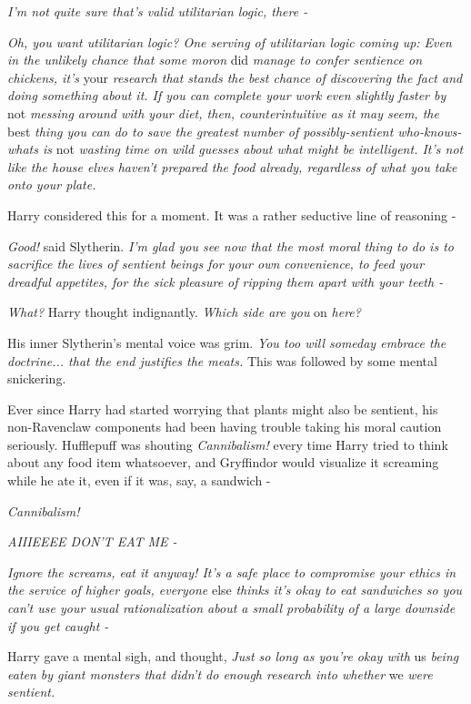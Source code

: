 \emph{I'm not quite sure that's valid utilitarian logic, there -}

\emph{Oh, you want utilitarian logic? One serving of utilitarian logic
coming up: Even in the unlikely chance that some moron} did \emph{manage
to confer sentience on chickens, it's} your \emph{research that stands
the best chance of discovering the fact and doing something about it. If
you can complete your work even slightly faster by} not \emph{messing
around with your diet, then, counterintuitive as it may seem, the} best
\emph{thing you can do to save the greatest number of possibly-sentient
who-knows-whats is} not \emph{wasting time on wild guesses about what
might be intelligent. It's not like the house elves haven't prepared the
food already, regardless of what you take onto your plate.}

Harry considered this for a moment. It was a rather seductive line of
reasoning -

\emph{Good!} said Slytherin. \emph{I'm glad you see now that the most
moral thing to do is to sacrifice the lives of sentient beings for your
own convenience, to feed your dreadful appetites, for the sick pleasure
of ripping them apart with your teeth -}

\emph{What?} Harry thought indignantly. \emph{Which side are you} on
\emph{here?}

His inner Slytherin's mental voice was grim. \emph{You too will someday
embrace the doctrine... that the end justifies the meats.} This was
followed by some mental snickering.

Ever since Harry had started worrying that plants might also be
sentient, his non-Ravenclaw components had been having trouble taking
his moral caution seriously. Hufflepuff was shouting \emph{Cannibalism!}
every time Harry tried to think about any food item whatsoever, and
Gryffindor would visualize it screaming while he ate it, even if it was,
say, a sandwich -

\emph{Cannibalism!}

\emph{AIIIEEEE DON'T EAT ME -}

\emph{Ignore the screams, eat it anyway! It's a safe place to compromise
your ethics in the service of higher goals, everyone} else \emph{thinks
it's okay to eat sandwiches so you can't use your usual rationalization
about a small probability of a large downside if you get caught -}

Harry gave a mental sigh, and thought, \emph{Just so long as you're okay
with} us \emph{being eaten by giant monsters that didn't do enough
research into whether} we \emph{were sentient.}

